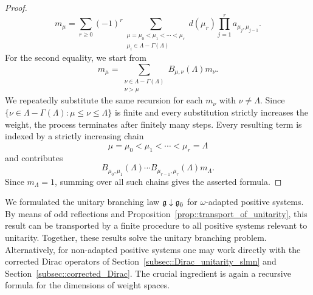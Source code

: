 \begin{proof}
\[
m_\mu
=
\sum_{r\geq0}(-1)^r
\sum_{\substack{
\mu=\mu_0<\mu_1<\cdots<\mu_r\\
\mu_i\in \Lambda-\Gamma(\Lambda)
}}
d(\mu_r)\prod_{j=1}^r a_{\mu_j,\mu_{j-1}}.
\]
For the second equality, we start from 
\[
m_\mu
=
\sum_{\substack{\nu\in\Lambda-\Gamma(\Lambda)\\ \nu>\mu}}
B_{\mu,\nu}(\Lambda)m_\nu.
\]
We repeatedly substitute the same recursion for each $m_\nu$ with $\nu\neq\Lambda$.
Since $\{\nu\in\Lambda-\Gamma(\Lambda):\mu\leq\nu\leq\Lambda\}$ is finite and every substitution strictly increases the weight, the process terminates after finitely many steps. Every resulting term is indexed by a strictly increasing chain
\[
\mu=\mu_0<\mu_1<\cdots<\mu_r=\Lambda
\]
and contributes
\[
B_{\mu_0,\mu_1}(\Lambda)\cdots
B_{\mu_{r-1},\mu_r}(\Lambda)m_\Lambda.
\]
Since $m_\Lambda=1$, summing over all such chains gives the asserted formula.
\end{proof}

We formulated the unitary branching law ${\mathfrak{g}}\downarrow{\mathfrak{g}_{\bar{0}}}$ for
$\omega$-adapted positive systems. By means of odd reflections and
Proposition~\ref{prop::transport_of_unitarity}, this result can be
transported by a finite procedure to all positive systems relevant to
unitarity. Together, these results solve the unitary branching problem.
Alternatively, for non-adapted positive systems one may work directly
with the corrected Dirac operators of
Section~\ref{subsec::Dirac_unitarity_slmn} and
Section~\ref{subsec::corrected_Dirac}. The crucial ingredient is again
a recursive formula for the dimensions of weight spaces.

